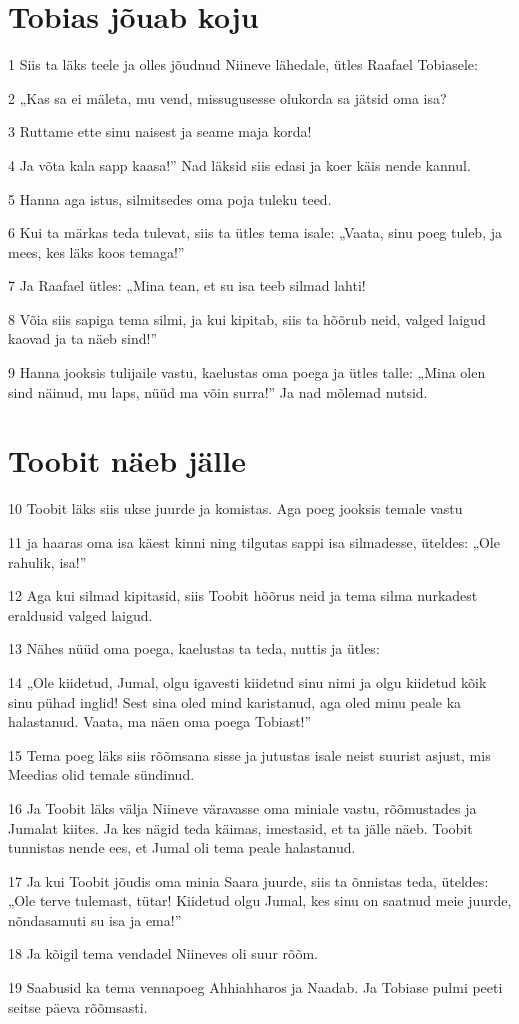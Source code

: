 \section*{Tobias jõuab koju}

\par 1 Siis ta läks teele ja olles jõudnud Niineve lähedale, ütles Raafael  Tobiasele:
\par 2 „Kas sa ei mäleta, mu vend, missugusesse olukorda sa jätsid oma  isa?
\par 3 Ruttame ette sinu naisest ja seame maja korda!
\par 4 Ja võta kala sapp kaasa!” Nad läksid siis edasi ja koer käis  nende kannul.
\par 5 Hanna aga istus, silmitsedes oma poja tuleku teed.
\par 6 Kui ta märkas teda tulevat, siis ta ütles tema isale: „Vaata,  sinu poeg tuleb, ja mees, kes läks koos temaga!”
\par 7 Ja Raafael ütles: „Mina tean, et su isa teeb silmad lahti!
\par 8 Võia siis sapiga tema silmi, ja kui kipitab, siis ta hõõrub neid,  valged laigud kaovad ja ta näeb sind!”
\par 9 Hanna jooksis tulijaile vastu, kaelustas oma poega ja ütles talle: „Mina  olen sind näinud, mu laps, nüüd ma võin surra!” Ja nad mõlemad  nutsid.

\section*{Toobit näeb jälle}

\par 10 Toobit läks siis ukse juurde ja komistas. Aga poeg jooksis temale  vastu
\par 11 ja haaras oma isa käest kinni ning tilgutas sappi isa  silmadesse, üteldes: „Ole rahulik, isa!”
\par 12 Aga kui silmad kipitasid, siis Toobit hõõrus neid ja tema silma  nurkadest eraldusid valged laigud.
\par 13 Nähes nüüd oma poega, kaelustas ta teda, nuttis ja ütles:
\par 14 „Ole kiidetud, Jumal, olgu igavesti kiidetud sinu nimi ja olgu  kiidetud kõik sinu pühad inglid! Sest sina oled mind karistanud, aga  oled minu peale ka halastanud. Vaata, ma näen oma poega Tobiast!”
\par 15 Tema poeg läks siis rõõmsana sisse ja jutustas isale neist  suurist asjust, mis Meedias olid temale sündinud.
\par 16 Ja Toobit läks välja Niineve väravasse oma miniale vastu,  rõõmustades ja Jumalat kiites. Ja kes nägid teda käimas, imestasid, et  ta jälle näeb. Toobit tunnistas nende ees, et Jumal oli tema peale  halastanud.
\par 17 Ja kui Toobit jõudis oma minia Saara juurde, siis ta õnnistas  teda, üteldes: „Ole terve tulemast, tütar! Kiidetud olgu Jumal, kes  sinu on saatnud meie juurde, nõndasamuti su isa ja ema!”
\par 18 Ja kõigil tema vendadel Niineves oli suur rõõm.
\par 19 Saabusid ka tema vennapoeg Ahhiahharos ja Naadab. Ja Tobiase  pulmi peeti seitse päeva rõõmsasti.

